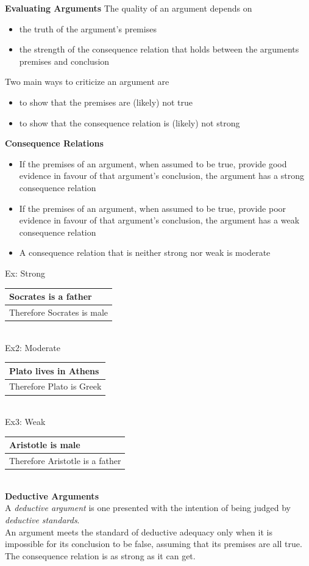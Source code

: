 \documentclass[11pt, fleqn]{article}
\begin{document}
\textbf{Evaluating Arguments}
The quality of an argument depends on
\begin{itemize}
    \item the truth of the argument's premises
    \item the strength of the consequence relation that holds between the arguments premises and conclusion
\end{itemize}
Two main ways to criticize an argument are
\begin{itemize}
    \item to show that the premises are (likely) not true
    \item to show that the consequence relation is (likely) not strong
\end{itemize}
\textbf{Consequence Relations}
\begin{itemize}
    \item If the premises of an argument, when assumed to be true, provide good evidence in favour of that argument's conclusion, the argument has a strong consequence relation
    \item If the premises of an argument, when assumed to be true, provide poor evidence in favour of that argument's conclusion, the argument has a weak consequence relation
    \item A consequence relation that is neither strong nor weak is moderate
\end{itemize}
Ex: Strong\\
\begin{tabular}{p{16cm}}
    Socrates is a father\\
    \hline
    Therefore Socrates is male
\end{tabular}\\
Ex2: Moderate\\
\begin{tabular}{p{16cm}}
Plato lives in Athens\\
\hline
Therefore Plato is Greek
\end{tabular}\\
Ex3: Weak\\
\begin{tabular}{p{16cm}}
Aristotle is male\\
\hline
Therefore Aristotle is a father
\end{tabular}\\

\textbf{Deductive Arguments}\\
A \textit{deductive argument} is one presented with the intention of being judged by \textit{deductive standards}.\\
An argument meets the standard of deductive adequacy only when it is impossible for its conclusion to be false, assuming that its premises are all true.\\
The consequence relation is as strong as it can get.\\
\end{document}
